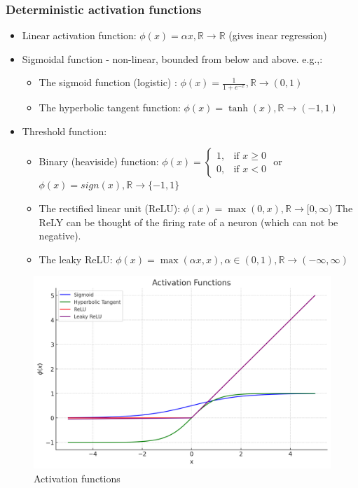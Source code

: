 \documentclass[11pt]{book} %
\begin{document}
\subsubsection{Deterministic activation functions}
\begin{itemize}
    \item Linear activation function: $\phi(x) = \alpha x, \mathbb{R} \rightarrow \mathbb{R}$ (gives inear regression)
    \item Sigmoidal function - non-linear, bounded from below and above. e.g.,: 
    \begin{itemize}
        \item The sigmoid function (logistic) : $\phi(x) = \frac{1}{1 + e^{-x}}, \mathbb{R} \rightarrow (0, 1)$
        \item The hyperbolic tangent function: $\phi(x) = \tanh(x) , \mathbb{R} \rightarrow (-1, 1)$     
    \end{itemize}
    \item Threshold function: 
    \begin{itemize}
        \item Binary (heaviside) function: $\phi(x) = \begin{cases} 1, & \text{if } x \geq 0 \\ 0, & \text{if } x < 0 \end{cases}$ or $\phi(x) = sign(x) , \mathbb{R} \rightarrow \{-1, 1\}$
        \item The rectified linear unit (ReLU): $\phi(x) = \max(0, x) , \mathbb{R} \rightarrow [0, \infty)$ 
            The ReLY can be thought of the firing rate of a neuron (which can not be negative).
        \item The leaky ReLU: $\phi(x) = \max(\alpha x, x), \alpha \in (0, 1), \mathbb{R} \rightarrow (-\infty, \infty)$
    \end{itemize}
\end{itemize}

\begin{figure}
    \centering
    \includegraphics[width=0.6\linewidth]{Figs/activation_functions.png}
    \caption{Activation functions}
\label{fig:activation_functions}
\end{figure}
\end{document}

